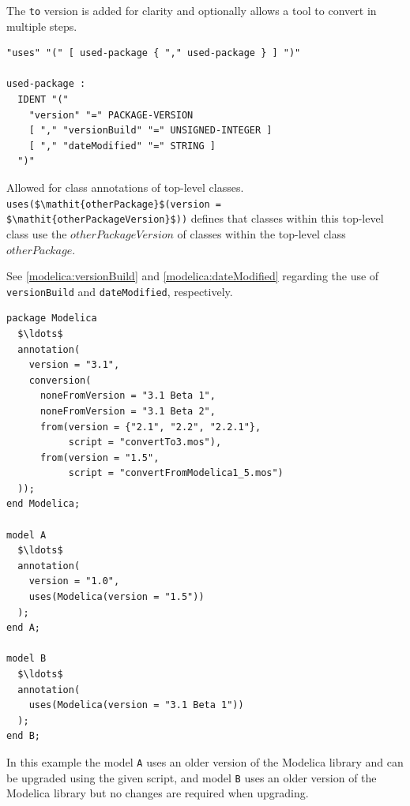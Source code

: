 \begin{annotationdefinition}[conversion]
\begin{semantics}
\begin{nonnormative}
The \lstinline!to! version is added for clarity and optionally allows a tool to convert in multiple steps.
\end{nonnormative}
\end{semantics}
\end{annotationdefinition}

\begin{annotationdefinition}[uses]
\begin{synopsis}[grammar]\begin{lstlisting}
"uses" "(" [ used-package { "," used-package } ] ")"

used-package :
  IDENT "("
    "version" "=" PACKAGE-VERSION
    [ "," "versionBuild" "=" UNSIGNED-INTEGER ]
    [ "," "dateModified" "=" STRING ]
  ")"
\end{lstlisting}\end{synopsis}
\begin{semantics}
Allowed for class annotations of top-level classes.
\lstinline!uses($\mathit{otherPackage}$(version = $\mathit{otherPackageVersion}$))! defines that classes within this top-level class use the $\mathit{otherPackageVersion}$ of classes within the top-level class $\mathit{otherPackage}$.

See \cref{modelica:versionBuild} and \cref{modelica:dateModified} regarding the use of \lstinline!versionBuild! and \lstinline!dateModified!, respectively.
\end{semantics}
\end{annotationdefinition}

\begin{example}
\begin{lstlisting}[language=modelica]
package Modelica
  $\ldots$
  annotation(
    version = "3.1",
    conversion(
      noneFromVersion = "3.1 Beta 1",
      noneFromVersion = "3.1 Beta 2",
      from(version = {"2.1", "2.2", "2.2.1"},
           script = "convertTo3.mos"),
      from(version = "1.5",
           script = "convertFromModelica1_5.mos")
  ));
end Modelica;

model A
  $\ldots$
  annotation(
    version = "1.0",
    uses(Modelica(version = "1.5"))
  );
end A;

model B
  $\ldots$
  annotation(
    uses(Modelica(version = "3.1 Beta 1"))
  );
end B;
\end{lstlisting}
In this example the model \lstinline!A! uses an older version of the Modelica library and can be upgraded using the given script, and model \lstinline!B! uses an older version of the Modelica library but no changes are required when upgrading.
\end{example}


